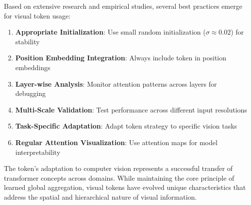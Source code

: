 Based on extensive research and empirical studies, several best practices emerge for visual \cls{} token usage:

\begin{enumerate}
\item \textbf{Appropriate Initialization}: Use small random initialization ($\sigma \approx 0.02$) for stability
\item \textbf{Position Embedding Integration}: Always include \cls{} token in position embeddings
\item \textbf{Layer-wise Analysis}: Monitor attention patterns across layers for debugging
\item \textbf{Multi-Scale Validation}: Test performance across different input resolutions
\item \textbf{Task-Specific Adaptation}: Adapt \cls{} token strategy to specific vision tasks
\item \textbf{Regular Attention Visualization}: Use attention maps for model interpretability
\end{enumerate}

The \cls{} token's adaptation to computer vision represents a successful transfer of transformer concepts across domains. While maintaining the core principle of learned global aggregation, visual \cls{} tokens have evolved unique characteristics that address the spatial and hierarchical nature of visual information.